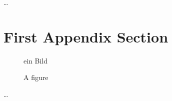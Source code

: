 
\Appendix

\dots
\section{First Appendix Section}
\label{sec:app-first-sections}



\begin{figure} [ht]
  \centering
   ein Bild
  \caption{A figure}
  \label{fig:BPMNBeispiela}
\end{figure}


\dots



